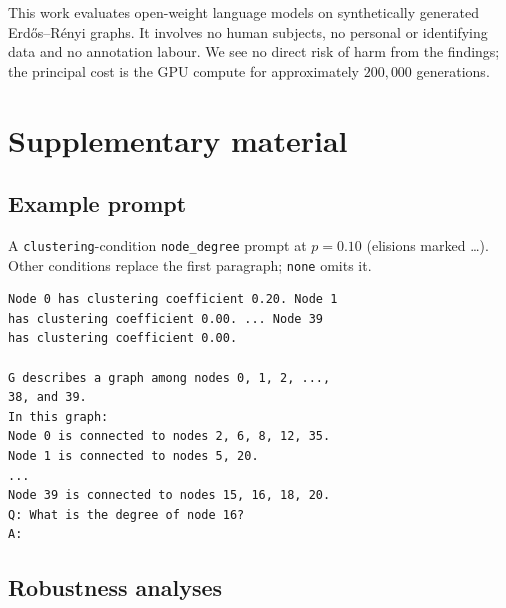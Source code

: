 \documentclass[11pt]{article}
\begin{document}
This work evaluates open-weight language models on synthetically generated
Erd\H{o}s--R\'enyi graphs. It involves no human subjects, no personal or
identifying data and no annotation labour. We see no direct risk of harm
from the findings; the principal cost is the GPU compute for approximately
$200{,}000$ generations.



\appendix

\section{Supplementary material}
\label{sec:appendix}

\subsection{Example prompt}
\label{sec:appendix-prompt}

A \texttt{clustering}-condition \texttt{node\_degree} prompt at $p{=}0.10$
(elisions marked \dots). Other conditions replace the first paragraph;
\texttt{none} omits it.

{\scriptsize
\begin{verbatim}
Node 0 has clustering coefficient 0.20. Node 1
has clustering coefficient 0.00. ... Node 39
has clustering coefficient 0.00.

G describes a graph among nodes 0, 1, 2, ...,
38, and 39.
In this graph:
Node 0 is connected to nodes 2, 6, 8, 12, 35.
Node 1 is connected to nodes 5, 20.
...
Node 39 is connected to nodes 15, 16, 18, 20.
Q: What is the degree of node 16?
A:
\end{verbatim}
}

\subsection{Robustness analyses}






\end{document}
